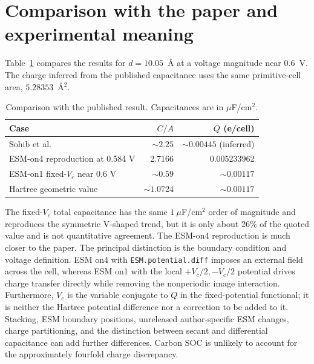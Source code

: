 \documentclass[11pt,a4paper]{article}
\begin{document}
\section{Comparison with the paper and experimental meaning}

Table~\ref{tab:papercomparison} compares the results for $d=10.05$~\AA{} at
a voltage magnitude near 0.6~V. The charge inferred from the published
capacitance uses the same primitive-cell area, $5.28353$~\AA$^2$.

\begin{table}[htbp]
\centering
\caption{Comparison with the published result. Capacitances are in
$\mu$F/cm$^2$.}
\label{tab:papercomparison}
\small
\begin{tabular}{lrr}
\toprule
Case & $C/A$ & $Q$ (e/cell)\\
\midrule
Sohib et al. & $\sim2.25$ & $\sim0.00445$ (inferred)\\
ESM-on4 reproduction at 0.584 V & 2.7166 & 0.005233962\\
ESM-on1 fixed-$V_c$ near 0.6 V & $\sim0.59$ & $\sim0.00117$\\
Hartree geometric value & $\sim1.0724$ & $\sim0.00117$\\
\bottomrule
\end{tabular}
\end{table}

The fixed-$V_c$ total capacitance has the same $1~\mu$F/cm$^2$ order of
magnitude and reproduces the symmetric V-shaped trend, but it is only about
26\% of the quoted value and is not quantitative agreement. The ESM-on4
reproduction is much closer to the paper. The principal distinction is the
boundary condition and voltage definition. ESM on4 with
\texttt{ESM.potential.diff} imposes an external field across the cell, whereas
ESM on1 with the local $+V_c/2,-V_c/2$ potential drives charge transfer directly
while removing the nonperiodic image interaction. Furthermore, $V_c$ is the
variable conjugate to $Q$ in the fixed-potential functional; it is neither the Hartree
potential difference nor a correction to be added to it. Stacking, ESM
boundary positions, unreleased author-specific ESM changes, charge
partitioning, and the distinction between secant and differential
capacitance can add further differences. Carbon SOC is unlikely to account
for the approximately fourfold charge discrepancy.
\end{document}
